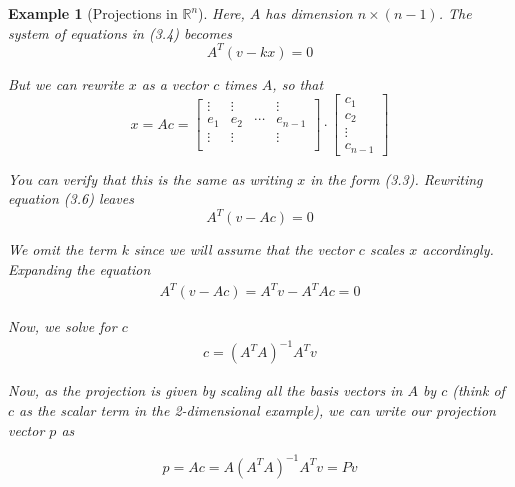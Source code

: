 \documentclass{book}
\newtheorem{example}{Example}[chapter]
\begin{document}
\begin{example}[Projections in $\mathbb{R}^{n}$]
    Here, $A$ has dimension $n\times (n-1)$. The system of equations in (3.4)
    becomes
    \begin{equation}
        A^{T}\left(v-kx\right) = 0
    \end{equation}

    But we can rewrite $x$ as a vector $c$ times $A$, so that
    \begin{equation}
        x = Ac =  \left[\begin{matrix}
                \vdots & \vdots &        & \vdots  \\
                e_1    & e_2    & \cdots & e_{n-1} \\
                \vdots & \vdots &        & \vdots  \\
            \end{matrix}\right]\cdot\left[\begin{matrix}
                c_1 \\c_2\\\vdots\\c_{n-1}
            \end{matrix}\right]
    \end{equation}

    You can verify that this is the same as writing $x$ in the form (3.3).
    Rewriting equation (3.6) leaves
    \begin{equation*}
        A^{T}\left(v-Ac\right) = 0
    \end{equation*}

    We omit the term $k$ since we will assume that the vector $c$ scales $x$
    accordingly. Expanding the equation
    \begin{equation}
        \begin{split}
            A^{T}\left(v-Ac\right) = A^{T}v - A^{T}Ac = 0
        \end{split}
    \end{equation}

    Now, we solve for $c$
    \begin{equation}
        \begin{split}
            c={(A^{T}A)}^{-1}A^{T}v
        \end{split}
    \end{equation}

    Now, as the projection is given by scaling all the basis vectors in $A$ by $c$
    (think of $c$ as the scalar term in the 2-dimensional example), we can write
    our projection vector $p$ as

    \begin{equation}
        p = Ac = A{(A^{T}A)}^{-1}A^{T}v = Pv
    \end{equation}


\end{example}
\end{document}
